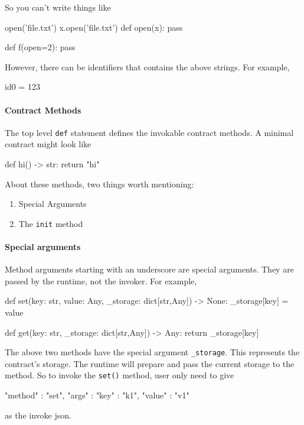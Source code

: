 \documentclass[dvipsnames]{article}
\begin{document}
So you can't write things like
\begin{simplepy}
open('file.txt')
x.open('file.txt')
def open(x):
    pass

def f(open=2):
    pass
\end{simplepy}

However, there can be identifiers that contains the above strings. For example,
\begin{simplepy}
id0 = 123
\end{simplepy}

\paragraph{Contract Methods}

The top level \texttt{def} statement defines the invokable contract methods. A
minimal contract might look like
\begin{simplepy}
def hi() -> str:
    return "hi"
\end{simplepy}

About these methods, two things worth mentioning:
\begin{enumerate}
\item Special Arguments
\item The \texttt{init} method
\end{enumerate}

\paragraph{Special arguments}

Method arguments starting with an underscore are special arguments. They are
passed by the runtime, not the invoker. For example,
\begin{simplepy}
def set(key: str, value: Any, _storage: dict[str,Any]) -> None:
    _storage[key] = value

def get(key: str, _storage: dict[str,Any]) -> Any:
    return _storage[key]
\end{simplepy}

The above two methods have the special argument \texttt{\_storage}. This
represents the contract's storage. The runtime will prepare and pass the current
storage to the method. So to invoke the \texttt{set()} method, user only need to
give
\begin{simplejs}
{
    "method" : "set",
    "args" : {
        "key" : "k1",
        "value" : "v1"
    }
}
\end{simplejs}
as the invoke json.
\end{document}
